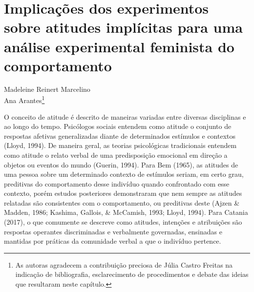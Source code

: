 \setcounter{footnote}{0}
\setcounter{figure}{0}
\setcounter{table}{0}
\chapter*{Implicações dos experimentos sobre atitudes implícitas para uma análise experimental feminista do comportamento}
\begin{flushright}
\begin{small}
    Madeleine Reinert Marcelino\\
    Ana Arantes\footnote{As autoras agradecem a contribuição preciosa de Júlia Castro Freitas na indicação de bibliografia, esclarecimento de procedimentos e debate das ideias que resultaram neste capítulo.}\\
\end{small}
\vspace{1cm}
\end{flushright}

O conceito de atitude é descrito de maneiras variadas entre diversas disciplinas e ao longo do tempo. Psicólogos sociais entendem como atitude o conjunto de respostas afetivas generalizadas diante de determinados estímulos e contextos (Lloyd, 1994). De maneira geral, as teorias psicológicas tradicionais entendem como atitude o relato verbal de uma predisposição emocional em direção a objetos ou eventos do mundo (Guerin, 1994). Para Bem (1965), as atitudes de uma pessoa sobre um determinado contexto de estímulos seriam, em certo grau, preditivas do comportamento desse indivíduo quando confrontado com esse contexto, porém estudos posteriores demonstraram que nem sempre as atitudes relatadas são consistentes com o comportamento, ou preditivas deste (Ajzen \& Madden, 1986; Kashima, Gallois, \& McCamish, 1993; Lloyd, 1994). Para Catania (2017), o que comumente se descreve como atitudes, intenções e atribuições são respostas operantes discriminadas e verbalmente governadas, ensinadas e mantidas por práticas da comunidade verbal a que o indivíduo pertence.

